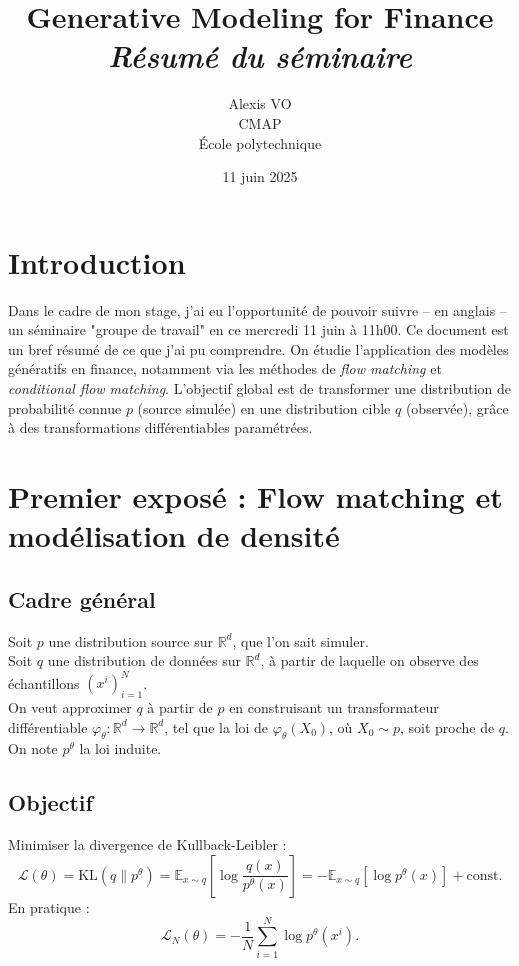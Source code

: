 \documentclass[11pt]{article}
\title{\Huge{\textbf{Generative Modeling for Finance}}\\ \medskip
      \Huge{\textit{Résumé du séminaire}}\vspace*{0.7cm}}
\author{\LARGE{Alexis VO}\vspace{1cm}\\ \medskip
      CMAP\\École polytechnique}
\date{\vspace{0.2cm}11 juin 2025}
\begin{document}
\maketitle
\newpage
\section*{Introduction}

Dans le cadre de mon stage, j'ai eu l'opportunité de pouvoir suivre -- en anglais -- un séminaire "groupe de travail" en ce mercredi 11 juin à 11h00. Ce document est un bref résumé de ce que j'ai pu comprendre. On étudie l'application des modèles génératifs en finance, notamment via les méthodes de \emph{flow matching} et \emph{conditional flow matching}. L’objectif global est de transformer une distribution de probabilité connue \( p \) (source simulée) en une distribution cible \( q \) (observée), grâce à des transformations différentiables paramétrées.

\tableofcontents
\newpage

\section{Premier exposé : Flow matching et modélisation de densité}

\subsection{Cadre général}

Soit \( p \) une distribution source sur \( \mathbb{R}^d \), que l'on sait simuler.\\
Soit \( q \) une distribution de données sur \( \mathbb{R}^d \), à partir de laquelle on observe des échantillons \( (x^i)_{i=1}^N \).\\
On veut approximer \( q \) à partir de \( p \) en construisant un transformateur différentiable \( \varphi_\theta : \mathbb{R}^d \to \mathbb{R}^d \), tel que la loi de \( \varphi_\theta(X_0) \), où \( X_0 \sim p \), soit proche de \( q \). On note \( p^\theta \) la loi induite.

\subsection{Objectif}
Minimiser la divergence de Kullback-Leibler :
\[
\mathcal{L}(\theta) = \text{KL}(q \| p^\theta) = \mathbb{E}_{x \sim q} \left[ \log \frac{q(x)}{p^\theta(x)} \right] = - \mathbb{E}_{x \sim q} \left[ \log p^\theta(x) \right] + \text{const}.
\]
En pratique :
\[
\mathcal{L}_N(\theta) = - \frac{1}{N} \sum_{i=1}^N \log p^\theta(x^i).
\]
\end{document}
